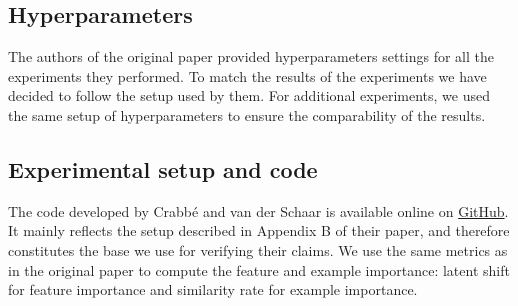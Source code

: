 \subsection{Hyperparameters}


The authors of the original paper provided hyperparameters settings for all the experiments they performed. To match the results of the experiments we have decided to follow the setup used by them. For additional experiments, we used the same setup of hyperparameters to ensure the comparability of the results. 

\subsection{Experimental setup and code}


The code developed by Crabb{\'e} and van der Schaar is available online on \href{https://github.com/JonathanCrabbe/Label-Free-XAI}{GitHub}. It mainly reflects the setup described in Appendix B of their paper, and therefore constitutes the base we use for verifying their claims. We use the same metrics as in the original paper to compute the feature and example importance: latent shift for feature importance and similarity rate for example importance.


